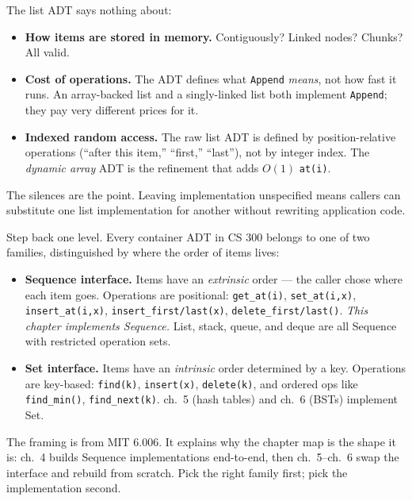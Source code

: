 \documentclass[11pt]{article}
\begin{document}
\begin{ideabox}
The list ADT says nothing about:
\begin{itemize}[leftmargin=*]
  \item \textbf{How items are stored in memory.} Contiguously?
        Linked nodes? Chunks? All valid.
  \item \textbf{Cost of operations.} The ADT defines what \texttt{Append}
        \emph{means}, not how fast it runs. An array-backed list and
        a singly-linked list both implement \texttt{Append}; they
        pay very different prices for it.
  \item \textbf{Indexed random access.} The raw list ADT is defined
        by position-relative operations (``after this item,''
        ``first,'' ``last''), not by integer index. The \emph{dynamic
        array} ADT is the refinement that adds $O(1)$
        \texttt{at(i)}.
\end{itemize}
The silences are the point. Leaving implementation unspecified means
callers can substitute one list implementation for another without
rewriting application code.
\end{ideabox}

\begin{notebox}
Step back one level. Every container ADT in CS 300 belongs to one of
two families, distinguished by where the order of items lives:
\begin{itemize}[leftmargin=*]
  \item \textbf{Sequence interface.} Items have an \emph{extrinsic}
        order --- the caller chose where each item goes. Operations
        are positional: \texttt{get\_at(i)}, \texttt{set\_at(i,x)},
        \texttt{insert\_at(i,x)}, \texttt{insert\_first/last(x)},
        \texttt{delete\_first/last()}. \emph{This chapter implements
        Sequence.} List, stack, queue, and deque are all Sequence
        with restricted operation sets.
  \item \textbf{Set interface.} Items have an \emph{intrinsic} order
        determined by a key. Operations are key-based:
        \texttt{find(k)}, \texttt{insert(x)}, \texttt{delete(k)},
        and ordered ops like \texttt{find\_min()},
        \texttt{find\_next(k)}. ch.~5 (hash tables) and ch.~6 (BSTs)
        implement Set.
\end{itemize}
The framing is from MIT 6.006. It explains why the chapter map is the
shape it is: ch.~4 builds Sequence implementations end-to-end, then
ch.~5--ch.~6 swap the interface and rebuild from scratch. Pick the
right family first; pick the implementation second.
\end{notebox}
\end{document}
